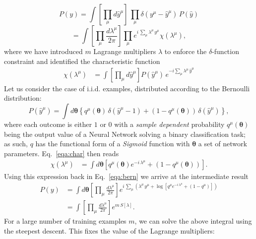 \documentclass{article}
\begin{document}
%
 \begin{equation}  \nonumber
 P(y) =  \int  \left[ \prod_{\mu} d \hat{y}^{\mu} \right]  \,  \prod_{\mu} \delta( y^{\mu} - \hat{y}^{\mu})  \, P(\hat{y})
\label{eqa:cl1}
 \end{equation}
 \begin{equation}
 =  \int  \left[ \prod_{\mu}  \frac{d\lambda^{\mu}}{2\pi} \right] \prod_{\mu}  e^{i \, \sum_{\mu} \lambda^{\mu} \, y^{\mu} } \chi(\lambda^{\mu}),
\end{equation}
%
where we have introduced $m$ Lagrange multipliers $\lambda$ to enforce the $\delta$-function constraint and identified  the characteristic function
%
\begin{align} \label{eqa:char}
\chi(\lambda^{\mu}) &=  \int  \left[ \prod_{\mu} d\hat{y}^{\mu} \right]  P(\hat{y}^{\mu} )  \, e^{-i \sum_{\mu} \lambda^{\mu} \, \hat{y}^{\mu}}
\end{align}
%
Let us consider the case of i.i.d. examples, distributed according to the Bernoulli distribution:
%
\begin{equation} \label{eqa:bern}
P(\hat{y}^{\mu} ) = \int d\boldsymbol{\theta} \left\{ q^{\mu}(\boldsymbol{\theta}) \, \delta(\hat{y}^{\mu}-1 ) + (1-q^{\mu}(\boldsymbol{\theta}) ) \, \delta(\hat{y}^{\mu}) \right\},
\end{equation}
%
where each outcome is either $1$ or $0$ with a {\it sample dependent} probability $q^{\mu}(\boldsymbol{\theta})$ being the output value of a Neural Network solving a binary classification task; as such, $q$ has the functional form of a {\it Sigmoid} function with $\boldsymbol{\theta}$ a set of network parameters. Eq.~\eqref{eqa:char} then reads
\begin{align} \label{eqa:char}
 \chi(\lambda^{\mu}) &=  \int  d\boldsymbol{\theta} \left[ q^{\mu}(\boldsymbol{\theta} ) e^{-i \, \lambda^{\mu} } +(1-q^{\mu}(\boldsymbol{\theta} )) \right].
 \end{align}
%
Using this expression back in Eq.~\eqref{eqa:bern} we arrive at the intermediate result
%
 \begin{align} \label{eqa:cl2} \nonumber
 P(y) &= \int d\boldsymbol{\theta} \left[ \prod_{\mu}  \frac{d\lambda^{\mu}}{2\pi} \right] e^{i \, \sum_{\mu} ( \lambda^{\mu} \, y^{\mu} + \log \left[ q^{\mu} e^{-i \, \lambda^{\mu} } +(1-q^{\mu}) \right] )}  \\
 &=  \int  \left[ \prod_{\mu}  \frac{d\lambda^{\mu}}{2\pi} \right] e^{m \, S[\lambda]}.
 \end{align}
%
For a large number of training examples $m$, we can solve the above integral using the steepest descent. This fixes the value of the Lagrange multipliers:
\end{document}
